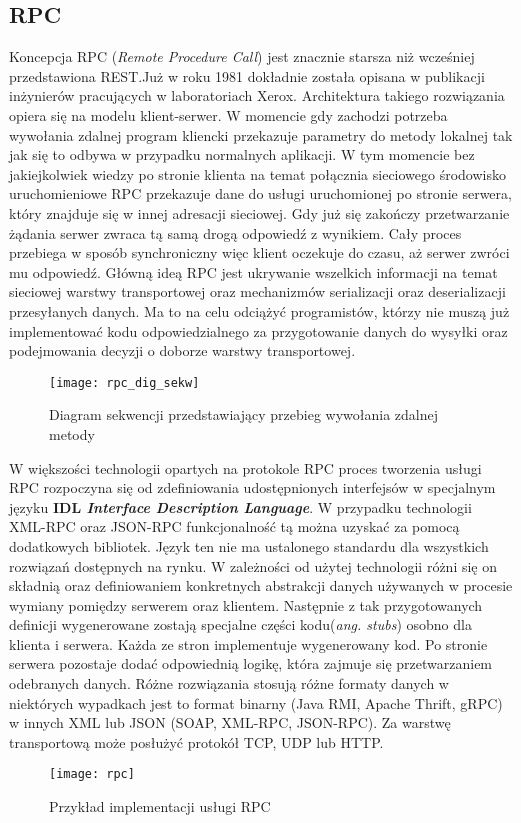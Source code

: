 \subsection{RPC}
Koncepcja RPC (\textit{Remote Procedure Call}) jest znacznie starsza niż wcześniej przedstawiona REST.\@ Już w roku 1981 dokładnie została opisana w publikacji inżynierów pracujących w laboratoriach Xerox\cite{nelson1981remote}. Architektura takiego rozwiązania opiera się na modelu klient-serwer. W momencie gdy zachodzi potrzeba wywołania zdalnej program kliencki przekazuje parametry do metody lokalnej tak jak się to odbywa w przypadku normalnych aplikacji. W tym momencie bez jakiejkolwiek wiedzy po stronie klienta na temat połącznia sieciowego środowisko uruchomieniowe RPC przekazuje dane do usługi uruchomionej po stronie serwera, który znajduje się w innej adresacji sieciowej. Gdy już się zakończy przetwarzanie żądania serwer zwraca tą samą drogą odpowiedź z wynikiem. Cały proces przebiega w sposób synchroniczny więc klient oczekuje do czasu, aż serwer zwróci mu odpowiedź. Główną ideą RPC jest ukrywanie wszelkich informacji na temat sieciowej warstwy transportowej oraz mechanizmów serializacji oraz deserializacji przesyłanych danych. Ma to na celu odciążyć programistów, którzy nie muszą już implementować kodu odpowiedzialnego za przygotowanie danych do wysyłki oraz podejmowania decyzji o doborze warstwy transportowej.
\begin{figure}[h]
    \caption{Diagram sekwencji przedstawiający przebieg wywołania zdalnej metody}
    \texttt{[image: rpc\_dig\_sekw]}
    \centering
  \end{figure}
\par W większości technologii opartych na protokole RPC proces tworzenia usługi RPC rozpoczyna się od zdefiniowania udostępnionych interfejsów w specjalnym języku \textbf{IDL \textit{Interface Description Language}}. W przypadku technologii XML-RPC oraz JSON-RPC funkcjonalność tą można uzyskać za pomocą dodatkowych bibliotek. Język ten nie ma ustalonego standardu dla wszystkich rozwiązań dostępnych na rynku. W zależności od użytej technologii różni się on składnią oraz definiowaniem konkretnych abstrakcji danych używanych w procesie wymiany pomiędzy serwerem oraz klientem. Następnie z tak przygotowanych definicji wygenerowane zostają specjalne części kodu(\textit{ang. stubs}) osobno dla klienta i serwera. Każda ze stron implementuje wygenerowany kod. Po stronie serwera pozostaje dodać odpowiednią logikę, która zajmuje się przetwarzaniem odebranych danych. Różne rozwiązania stosują różne formaty danych w niektórych wypadkach jest to format binarny (Java RMI, Apache Thrift, gRPC) w innych XML lub JSON (SOAP, XML-RPC, JSON-RPC). Za warstwę transportową może posłużyć protokół TCP, UDP lub HTTP.
\begin{figure}[h]
    \caption{Przykład implementacji usługi RPC}
    \texttt{[image: rpc]}
    \centering
\end{figure}
